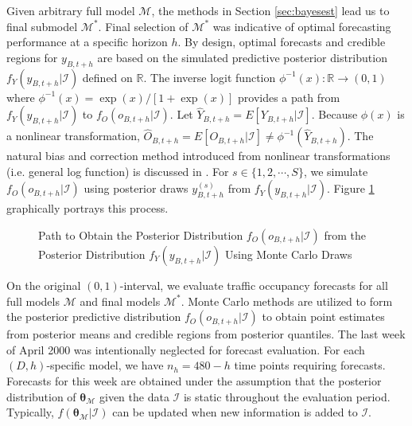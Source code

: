 Given arbitrary full model  $\mathcal{M}$, the methods in Section \ref{sec:bayesest} lead us to final submodel $\mathcal{M}^*$. Final selection of $\mathcal{M}^*$ was indicative of optimal forecasting performance at a specific horizon $h$. By design, optimal forecasts and credible regions for $y_{B,t+h}$ are based on the simulated predictive posterior distribution $f_Y(y_{B,t+h}|\mathcal{I})$ defined on $\mathbb{R}$. The inverse logit function $\phi^{-1}(x):\mathbb{R}\to (0,1)$ where $\phi^{-1}(x)=\exp(x)/[1+\exp(x)]$ provides a path from $f_Y(y_{B,t+h}|\mathcal{I})$ to $f_O(o_{B,t+h}|\mathcal{I})$. Let $\widehat{Y}_{B,t+h}=E[Y_{B,t+h}|\mathcal{I}]$. Because $\phi(x)$ is a nonlinear transformation, $\widehat{O}_{B,t+h}=E[O_{B,t+h}|\mathcal{I}] \neq \phi^{-1}(\widehat{Y}_{B,t+h})$. The natural bias and correction method introduced from nonlinear transformations (i.e. general log function) is discussed in \cite{Metcalfe2009}. For $s \in \{1,2,\cdots, S\}$, we simulate $f_O(o_{B,t+h}|\mathcal{I})$ using posterior draws $y^{(s)}_{B,t+h}$ from $f_Y(y_{B,t+h}|\mathcal{I})$. Figure \ref{fig:posttrans} graphically portrays this process.

\begin{figure}[!h]
\label{fig:posttrans}
\caption{Path to Obtain the Posterior Distribution $f_O(o_{B,t+h}|\mathcal{I})$ from the Posterior Distribution  $f_Y(y_{B,t+h}|\mathcal{I})$ Using Monte Carlo Draws}
\centering
{}
\end{figure}

On the original $(0,1)$-interval, we evaluate traffic occupancy forecasts for all full models $\mathcal{M}$ and final models $\mathcal{M}^*$. Monte Carlo methods are utilized to form the posterior predictive distribution  $f_O(o_{B,t+h}|\mathcal{I})$ to obtain point estimates from posterior means and credible regions from posterior quantiles. The last week of April 2000 was intentionally neglected for forecast evaluation. For each $(D,h)$-specific model, we have $n_h=480-h$ time points requiring forecasts. Forecasts for this week are obtained under the assumption that the posterior distribution of $\bm{\theta}_\mathcal{M}$ given the data $\mathcal{I}$ is static throughout the evaluation period. Typically, $f(\bm{\theta}_\mathcal{M}|\mathcal{I})$ can be updated when new information is added to $\mathcal{I}$.

